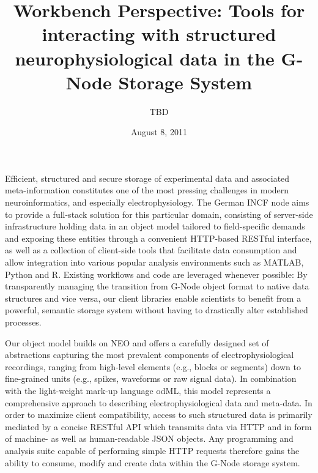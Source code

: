 \documentclass[a4paper]{article}
\begin{document}
\title{Workbench Perspective: Tools for interacting with
  structured neurophysiological data in the G-Node Storage System}

\author{TBD} %
\date{August 8, 2011}

\maketitle


Efficient, structured and secure storage of experimental data and
associated meta-information constitutes one of the most pressing
challenges in modern neuroinformatics, and especially
electrophysiology. The German INCF node aims to provide a full-stack
solution for this particular domain, consisting of server-side
infrastructure holding data in an object model tailored to
field-specific demands and exposing these entities through a
convenient HTTP-based RESTful interface, as well as a collection of
client-side tools that facilitate data consumption and allow
integration into various popular analysis environments such as MATLAB,
Python and R. Existing workflows and code are leveraged whenever
possible: By transparently managing the transition from G-Node object
format to native data structures and vice versa, our client libraries
enable scientists to benefit from a powerful, semantic storage system
without having to drastically alter established processes.

Our object model builds on NEO and offers a carefully
designed set of abstractions capturing the most prevalent components
of electrophysiological recordings, ranging from high-level elements
(e.g., blocks or segments) down to fine-grained units (e.g., spikes,
waveforms or raw signal data). In combination with the light-weight
mark-up language odML, this model represents a comprehensive approach
to describing electrophysiological data and meta-data. In order to
maximize client compatibility, access to such structured data is
primarily mediated by a concise RESTful API which transmits data via
HTTP and in form of machine- as well as human-readable JSON
objects. Any programming and analysis suite capable of performing
simple HTTP requests therefore gains the ability to consume, modify
and create data within the G-Node storage system.
\end{document}

